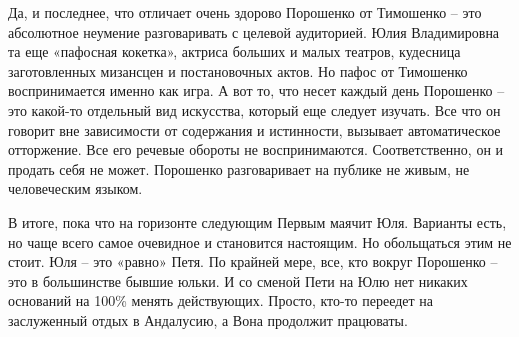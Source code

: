 Да, и последнее, что отличает очень здорово Порошенко от Тимошенко – это
абсолютное неумение разговаривать с целевой аудиторией. Юлия Владимировна та
еще «пафосная кокетка», актриса больших и малых театров, кудесница
заготовленных мизансцен и постановочных актов. Но пафос от Тимошенко
воспринимается именно как игра. А вот то, что несет каждый день Порошенко – это
какой-то отдельный вид искусства, который еще следует изучать. Все что он
говорит вне зависимости от содержания и истинности, вызывает автоматическое
отторжение. Все его речевые обороты не воспринимаются. Соответственно, он и
продать себя не может. Порошенко разговаривает на публике не живым, не
человеческим языком.

В итоге, пока что на горизонте следующим Первым маячит Юля. Варианты есть, но
чаще всего самое очевидное и становится настоящим. Но обольщаться этим не
стоит. Юля – это «равно» Петя. По крайней мере, все, кто вокруг Порошенко – это
в большинстве бывшие юльки. И со сменой Пети на Юлю нет никаких оснований на
100\% менять действующих. Просто, кто-то переедет на заслуженный отдых в
Андалусию, а Вона продолжит працюваты.

